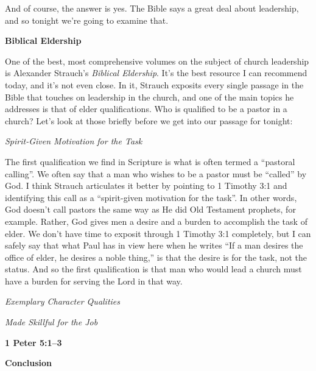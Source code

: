 \documentclass[letterpaper, 12pt]{article}
\begin{document}
    And of course, the answer is yes. The Bible says a great deal about
    leadership, and so tonight we're going to examine that.

    \noindent \textbf{Biblical Eldership}

    One of the best, most comprehensive volumes on the subject of church
    leadership is Alexander Strauch's \emph{Biblical Eldership}. It's
    the best resource I can recommend today, and it's not even close. In
    it, Strauch exposits every single passage in the Bible that touches
    on leadership in the church, and one of the main topics he addresses
    is that of elder qualifications. Who is qualified to be a pastor in
    a church? Let's look at those briefly before we get into our passage
    for tonight:

    \noindent \emph{Spirit-Given Motivation for the Task}

    The first qualification we find in Scripture is what is often termed
    a ``pastoral calling''. We often say that a man who wishes to be a
    pastor must be ``called'' by God. I think Strauch articulates it
    better by pointing to 1 Timothy 3:1 and identifying this call as a
    ``spirit-given motivation for the task''. In other words, God
    doesn't call pastors the same way as He did Old Testament prophets,
    for example. Rather, God gives men a desire and a burden to
    accomplish the task of elder. We don't have time to exposit through
    1 Timothy 3:1 completely, but I can safely say that what Paul has in
    view here when he writes ``If a man desires the office of elder, he
    desires a noble thing,'' is that the desire is for the task, not the
    status. And so the first qualification is that man who would lead a
    church must have a burden for serving the Lord in that way.

    \noindent \emph{Exemplary Character Qualities}

    \noindent \emph{Made Skillful for the Job}

    \noindent \textbf{1 Peter 5:1--3}

    \noindent \textbf{Conclusion}
\end{document}
